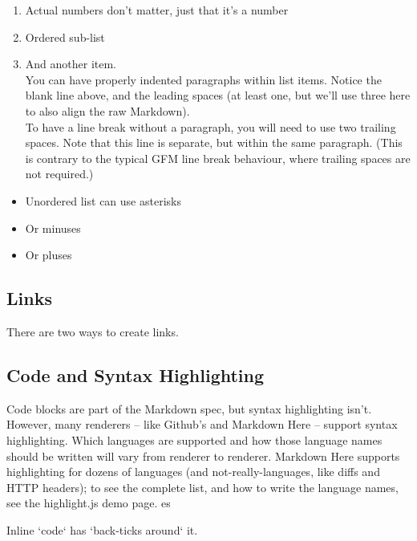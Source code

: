 \begin{enumerate}
	\item Actual numbers don't matter, just that it's a number \\
	\item Ordered sub-list \\
	\item And another item. \\
	
	You can have properly indented paragraphs within list items. Notice the blank line above, and the leading spaces (at least one, but we'll use three here to also align the raw Markdown). \\
	
	To have a line break without a paragraph, you will need to use two trailing spaces.
Note that this line is separate, but within the same paragraph.
(This is contrary to the typical GFM line break behaviour, where trailing spaces are not required.)
\end{enumerate}

\begin{itemize}[label=\textbullet]
	\item Unordered list can use asterisks
	\item Or minuses
	\item Or pluses
\end{itemize}

\subsection{Links}

There are two ways to create links.


\vspace{2cm}

\subsection{Code and Syntax Highlighting}

Code blocks are part of the Markdown spec, but syntax highlighting isn't. However, many renderers -- like Github's and Markdown Here -- support syntax highlighting. Which languages are supported and how those language names should be written will vary from renderer to renderer. Markdown Here supports highlighting for dozens of languages (and not-really-languages, like diffs and HTTP headers); to see the complete list, and how to write the language names, see the highlight.js demo page.
es
\begin{mdframed}
Inline `code` has `back-ticks around` it.
\end{mdframed}

